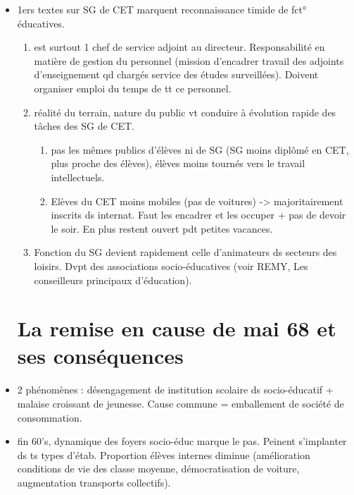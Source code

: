 \documentclass[12pt]{report}
\begin{document}
\begin{itemize}
\item 1ers textes sur SG de CET marquent reconnaissance timide de fct° éducatives.
\begin{enumerate}
\item est surtout 1 chef de service adjoint au directeur. Responsabilité en matière de gestion du personnel (mission d'encadrer travail des adjoints d'enseignement qd chargés service des études surveillées). Doivent organiser emploi du temps de tt ce personnel. \\
\item réalité du terrain, nature du public vt conduire à évolution rapide des tâches des SG de CET.\\
\begin{enumerate}
\item pas les mêmes publics d'élèves ni de SG (SG moins diplômé en CET, plus proche des élèves), élèves moins tournés vers le travail intellectuels.\\
\item  Elèves du CET moins mobiles (pas de voitures) -> majoritairement inscrits ds internat. Faut les encadrer et les occuper + pas de devoir le soir. En plus restent ouvert pdt petites vacances. \\
\end{enumerate}
\item Fonction du SG devient rapidement celle d'animateurs ds secteurs des loisirs. Dvpt des associations socio-éducatives (voir REMY, Les conseilleurs principaux d'éducation).

\end{enumerate}

\section{La remise en cause de mai 68 et ses conséquences}

\item 2 phénomènes : désengagement de institution scolaire ds socio-éducatif + malaise croissant de jeunesse. Cause commune = emballement de société de consommation. \\

\item fin 60's, dynamique des foyers socio-éduc marque le pas. Peinent s'implanter ds ts types d'étab. Proportion élèves internes diminue (amélioration conditions de vie des classe moyenne, démocratisation de voiture, augmentation transports collectifs).\\


\end{itemize}
\end{document}
